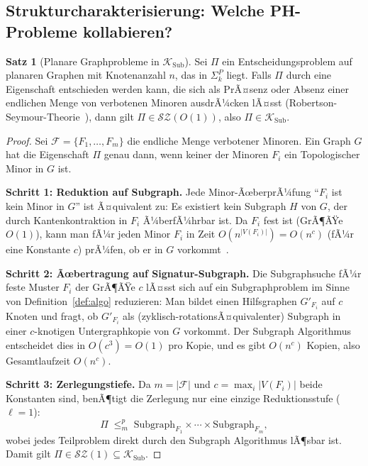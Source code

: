 ﻿\documentclass[a4paper,12pt]{article}
\theoremstyle{definition}
\newtheorem{satz}{Satz}
\begin{document}
\subsection{Strukturcharakterisierung: Welche PH-Probleme kollabieren?}

\begin{satz}[Planare Graphprobleme in $\mathcal{K}_\mathrm{Sub}$]
\label{satz:planar}
  Sei $\Pi$ ein Entscheidungsproblem auf planaren Graphen mit Knotenanzahl $n$,
  das in $\Sigma_k^P$ liegt.
  Falls $\Pi$ durch eine Eigenschaft entschieden werden kann, die sich als
  PrÃ¤senz oder Absenz einer endlichen Menge von verbotenen Minoren ausdrÃ¼cken
  lÃ¤sst (Robertson-Seymour-Theorie~\cite{robertson1986graph}),
  dann gilt $\Pi \in \mathcal{SZ}(O(1))$, also $\Pi \in \mathcal{K}_\mathrm{Sub}$.
\end{satz}

\begin{proof}
  Sei $\mathcal{F} = \{F_1, \ldots, F_m\}$ die endliche Menge verbotener Minoren.
  Ein Graph $G$ hat die Eigenschaft $\Pi$ genau dann, wenn keiner der Minoren $F_i$
  ein Topologischer Minor in $G$ ist.

  \textbf{Schritt 1: Reduktion auf Subgraph.}
  Jede Minor-ÃœberprÃ¼fung ``$F_i$ ist kein Minor in $G$'' ist Ã¤quivalent zu:
  Es existiert kein Subgraph $H$ von $G$, der durch Kantenkontraktion in $F_i$
  Ã¼berfÃ¼hrbar ist. Da $F_i$ fest ist (GrÃ¶ÃŸe $O(1)$), kann man fÃ¼r jeden Minor $F_i$
  in Zeit $O(n^{|V(F_i)|}) = O(n^c)$ (fÃ¼r eine Konstante $c$) prÃ¼fen, ob er
  in $G$ vorkommt~\cite{robertson1995graph}.

  \textbf{Schritt 2: Ãœbertragung auf Signatur-Subgraph.}
  Die Subgraphsuche fÃ¼r feste Muster $F_i$ der GrÃ¶ÃŸe $c$ lÃ¤sst sich auf
  ein Subgraphproblem im Sinne von Definition~\ref{def:algo} reduzieren:
  Man bildet einen Hilfsgraphen $G'_{F_i}$ auf $c$ Knoten und fragt,
  ob $G'_{F_i}$ als (zyklisch-rotationsÃ¤quivalenter) Subgraph in einer
  $c$-knotigen Untergraphkopie von $G$ vorkommt.
  Der Subgraph Algorithmus entscheidet dies in $O(c^3) = O(1)$ pro Kopie,
  und es gibt $O(n^c)$ Kopien, also Gesamtlaufzeit $O(n^c)$.

  \textbf{Schritt 3: Zerlegungstiefe.}
  Da $m = |\mathcal{F}|$ und $c = \max_i |V(F_i)|$ beide Konstanten sind,
  benÃ¶tigt die Zerlegung nur eine einzige Reduktionsstufe ($\ell = 1$):
  \[
    \Pi \;\leq_m^p\; \mathrm{Subgraph}_{F_1} \times \cdots \times \mathrm{Subgraph}_{F_m},
  \]
  wobei jedes Teilproblem direkt durch den Subgraph Algorithmus lÃ¶sbar ist.
  Damit gilt $\Pi \in \mathcal{SZ}(1) \subseteq \mathcal{K}_\mathrm{Sub}$.
\end{proof}
\end{document}
